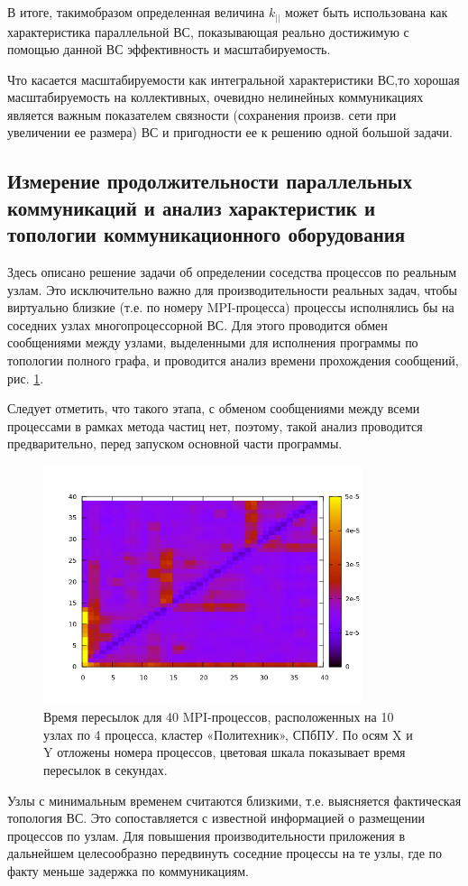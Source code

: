 		В итоге, такимобразом определенная  величина $k_{||} $ может быть использована как характеристика параллельной ВС, показывающая реально достижимую с помощью данной ВС эффективность и масштабируемость.
		
		Что касается масштабируемости как интегральной характеристики ВС,то хорошая масштабируемость на коллективных, очевидно нелинейных коммуникациях является важным показателем связности (сохранения произв. сети при увеличении ее размера) ВС и пригодности ее к решению одной большой задачи.
		
		\subsection{Измерение продолжительности параллельных коммуникаций и анализ характеристик и топологии коммуникационного оборудования}
		Здесь описано решение задачи об определении соседства процессов по реальным узлам. Это исключительно важно для производительности реальных задач, чтобы виртуально близкие (т.е. по номеру MPI-процесса) процессы исполнялись бы на соседних узлах многопроцессорной ВС. Для этого проводится обмен сообщениями между узлами, выделенными 
		для исполнения программы по топологии полного графа, и проводится анализ времени прохождения сообщений, рис. \ref{poly_all2all}.  
		
		Следует отметить, что такого этапа, с обменом сообщениями между всеми процессами в рамках метода частиц нет, поэтому, такой анализ проводится предварительно, перед запуском основной части программы.

		
		\begin{figure}[htb]
			\begin{center}
				\includegraphics[height=7cm,keepaspectratio]{images/polytech_all_to_all.png}
			\end{center}
			\caption{Время пересылок для 40 MPI-процессов, расположенных на 10 узлах по 4 процесса, кластер «Политехник», СПбПУ. По осям X и Y отложены номера процессов, цветовая шкала показывает время пересылок в секундах.}
			\label{poly_all2all}
		\end{figure} 
		Узлы с минимальным временем считаются близкими, т.е. выясняется фактическая топология ВС. Это сопоставляется с известной информацией о размещении процессов по узлам.	Для повышения производительности приложения в дальнейшем целесообразно передвинуть соседние процессы на те узлы, где по факту меньше задержка по коммуникациям.
		
